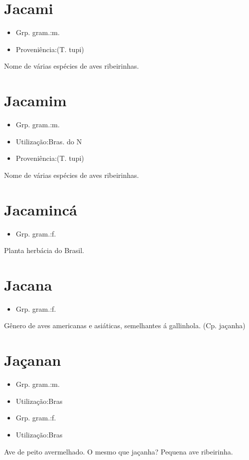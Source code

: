 \documentclass{article}
\begin{document}
\section{Jacami}
\begin{itemize}
\item {Grp. gram.:m.}
\end{itemize}
\begin{itemize}
\item {Proveniência:(T. tupi)}
\end{itemize}
Nome de várias espécies de aves ribeirinhas.
\section{Jacamim}
\begin{itemize}
\item {Grp. gram.:m.}
\end{itemize}
\begin{itemize}
\item {Utilização:Bras. do N}
\end{itemize}
\begin{itemize}
\item {Proveniência:(T. tupi)}
\end{itemize}
Nome de várias espécies de aves ribeirinhas.
\section{Jacamincá}
\begin{itemize}
\item {Grp. gram.:f.}
\end{itemize}
Planta herbácia do Brasil.
\section{Jacana}
\begin{itemize}
\item {Grp. gram.:f.}
\end{itemize}
Gênero de aves americanas e asiáticas, semelhantes á gallinhola.
(Cp. \textunderscore jaçanha\textunderscore )
\section{Jaçanan}
\begin{itemize}
\item {Grp. gram.:m.}
\end{itemize}
\begin{itemize}
\item {Utilização:Bras}
\end{itemize}
\begin{itemize}
\item {Grp. gram.:f.}
\end{itemize}
\begin{itemize}
\item {Utilização:Bras}
\end{itemize}
Ave de peito avermelhado.
O mesmo que \textunderscore jaçanha\textunderscore ?
Pequena ave ribeirinha.
\end{document}
